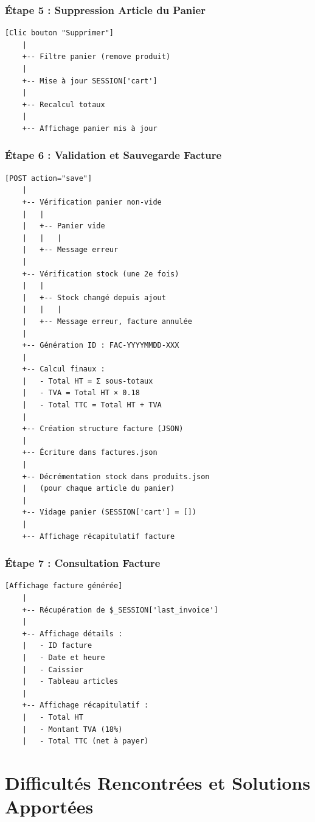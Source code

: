 \documentclass[12pt,a4paper]{report}
\begin{document}
\subsection{Étape 5 : Suppression Article du Panier}

\begin{verbatim}
[Clic bouton "Supprimer"]
    |
    +-- Filtre panier (remove produit)
    |
    +-- Mise à jour SESSION['cart']
    |
    +-- Recalcul totaux
    |
    +-- Affichage panier mis à jour
\end{verbatim}

\subsection{Étape 6 : Validation et Sauvegarde Facture}

\begin{verbatim}
[POST action="save"]
    |
    +-- Vérification panier non-vide
    |   |
    |   +-- Panier vide
    |   |   |
    |   +-- Message erreur
    |
    +-- Vérification stock (une 2e fois)
    |   |
    |   +-- Stock changé depuis ajout
    |   |   |
    |   +-- Message erreur, facture annulée
    |
    +-- Génération ID : FAC-YYYYMMDD-XXX
    |
    +-- Calcul finaux :
    |   - Total HT = Σ sous-totaux
    |   - TVA = Total HT × 0.18
    |   - Total TTC = Total HT + TVA
    |
    +-- Création structure facture (JSON)
    |
    +-- Écriture dans factures.json
    |
    +-- Décrémentation stock dans produits.json
    |   (pour chaque article du panier)
    |
    +-- Vidage panier (SESSION['cart'] = [])
    |
    +-- Affichage récapitulatif facture
\end{verbatim}

\subsection{Étape 7 : Consultation Facture}

\begin{verbatim}
[Affichage facture générée]
    |
    +-- Récupération de $_SESSION['last_invoice']
    |
    +-- Affichage détails :
    |   - ID facture
    |   - Date et heure
    |   - Caissier
    |   - Tableau articles
    |
    +-- Affichage récapitulatif :
    |   - Total HT
    |   - Montant TVA (18%)
    |   - Total TTC (net à payer)
\end{verbatim}

\chapter{Difficultés Rencontrées et Solutions Apportées}
\end{document}

